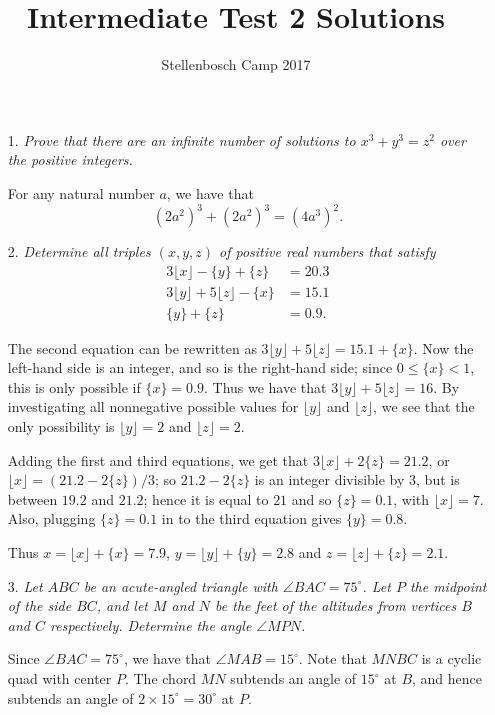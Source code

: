 \documentclass[12pt]{article}
\title{Intermediate Test 2 Solutions}
\author{Stellenbosch Camp 2017}
\begin{document}
 \maketitle

\begin{enumerate}


\item[1.] \emph{Prove that there are an infinite number of solutions to $x^3 + y^3 = z^2$ over the positive integers.}

For any natural number $a$, we have that
\[
    (2a^2)^3 + (2a^2)^3 = (4a^3)^2.
\]


\item[2.] \emph{Determine all triples $(x,y,z)$ of positive real numbers that satisfy
\begin{align*}
	3\lfloor{x}\rfloor -\{y\} +\{z\} &= 20.3 \\
	3\lfloor{y}\rfloor +5\lfloor{z}\rfloor -\{x\} &= 15.1 \\
	\{y\} +\{z\} &= 0.9.
\end{align*}
}

The second equation can be rewritten as $3\lfloor{y}\rfloor +5\lfloor{z}\rfloor = 15.1 +\{x\}$. Now the left-hand side is an integer, and so is the right-hand side; since $0 \leq \{x\} < 1$, this is only possible if $\{x\} = 0.9$. Thus we have that $3\lfloor{y}\rfloor +5\lfloor{z}\rfloor = 16$. By investigating all nonnegative possible values for $\lfloor{y}\rfloor$ and $\lfloor{z}\rfloor$, we see that the only possibility is $\lfloor{y}\rfloor = 2$ and $\lfloor{z}\rfloor = 2$.

Adding the first and third equations, we get that $3\lfloor{x}\rfloor +2\{z\} = 21.2$, or $\lfloor{x}\rfloor = (21.2-2\{z\})/3$; so $21.2-2\{z\}$ is an integer divisible by 3, but is between $19.2$ and $21.2$; hence it is equal to $21$ and so $\{z\} = 0.1$, with $\lfloor{x}\rfloor = 7$. Also, plugging $\{z\} = 0.1$ in to the third equation gives $\{y\} = 0.8$.

Thus $x = \lfloor{x}\rfloor +\{x\} = 7.9$, $y = \lfloor{y}\rfloor +\{y\} = 2.8$ and $z = \lfloor{z}\rfloor +\{z\} = 2.1$.


\item[3.] \emph{Let $ABC$ be an acute-angled triangle with $\angle BAC = 75^\circ$. Let $P$ the midpoint of the side $BC$, and let $M$ and $N$ be the feet of the altitudes from vertices $B$ and $C$ respectively. Determine the angle $\angle MPN$.}

Since $\angle BAC = 75^\circ$, we have that $\angle MAB = 15^\circ$. Note that
$MNBC$ is a cyclic quad with center $P$. The chord $MN$ subtends an angle of
$15^\circ$ at $B$, and hence subtends an angle of $2 \times 15^\circ = 30^\circ$
at $P$.



\end{enumerate}
\end{document}
